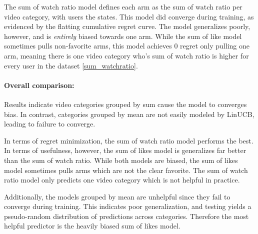 The sum of watch ratio model defines each arm as the sum of watch ratio per video category, with users the states. This model did converge during training, as evidenced by the flatting cumulative regret curve. The model generalizes poorly, however, and is \textit{entirely} biased towards one arm. While the sum of like model sometimes pulls non-favorite arms, this model achieves 0 regret only pulling one arm, meaning there is one video category who's sum of watch ratio is higher for every user in the dataset \ref{sum_watchratio}.

\paragraph{Overall comparison: }

Results indicate video categories grouped by sum cause the model to converges bias. In contrast, categories grouped by mean are not easily modeled by LinUCB, leading to failure to converge. 

In terms of regret minimization, the sum of watch ratio model performs the best. In terms of usefulness, however, the sum of likes model is generalizes far better than the sum of watch ratio. While both models are biased, the sum of likes model sometimes pulls arms which are not the clear favorite. The sum of watch ratio model only predicts one video category which is not helpful in practice. 

Additionally, the models grouped by mean are unhelpful since they fail to converge during training. This indicates poor generalization, and testing yields a pseudo-random distribution of predictions across categories. Therefore the most helpful predictor is the heavily biased sum of likes model.



    

